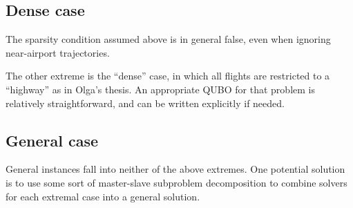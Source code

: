 \documentclass{article}
\begin{document}
\subsection{Dense case}
The sparsity condition assumed above is in general false, even when ignoring near-airport trajectories.

The other extreme is the ``dense'' case, in which all flights are restricted to a ``highway'' as in Olga's thesis.
An appropriate QUBO for that problem is relatively straightforward, and can be written explicitly if needed.

\subsection{General case}
General instances fall into neither of the above extremes.
One potential solution is to use some sort of master-slave subproblem decomposition to combine solvers for each extremal case into a general solution.
\end{document}
